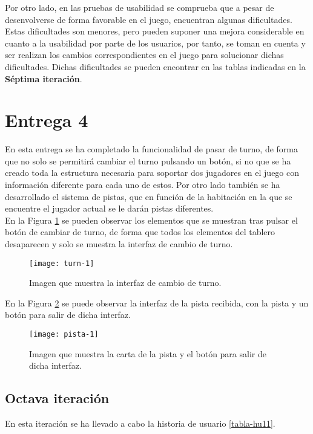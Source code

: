 Por otro lado, en las pruebas de usabilidad se comprueba que a pesar de desenvolverse de forma favorable en el juego, encuentran algunas dificultades. Estas dificultades son menores, pero pueden suponer una mejora considerable en cuanto a la usabilidad por parte de los usuarios, por tanto, se toman en cuenta y ser realizan los cambios correspondientes en el juego para solucionar dichas dificultades. Dichas dificultades se pueden encontrar en las tablas indicadas en la \textbf{Séptima iteración}.

\section{Entrega 4}
En esta entrega se ha completado la funcionalidad de pasar de turno, de forma que no solo se permitirá cambiar el turno pulsando un botón, si no que se ha creado toda la estructura necesaria para soportar dos jugadores en el juego con información diferente para cada uno de estos. Por otro lado también se ha desarrollado el sistema de pistas, que en función de la habitación en la que se encuentre el jugador actual se le darán pistas diferentes.\\

En la Figura \ref{figura-turn-1} se pueden observar los elementos que se muestran tras pulsar el botón de cambiar de turno, de forma que todos los elementos del tablero desaparecen y solo se muestra la interfaz de cambio de turno.

\begin{figure}[h]
  \centering
  \texttt{[image: turn-1]}
  \caption{Imagen que muestra la interfaz de cambio de turno.}
  \label{figura-turn-1}
\end{figure}

\newpage

En la Figura \ref{figura-pista-1} se puede observar la interfaz de la pista recibida, con la pista y un botón para salir de dicha interfaz.

\begin{figure}[h]
  \centering
  \texttt{[image: pista-1]}
  \caption{Imagen que muestra la carta de la pista y el botón para salir de dicha interfaz.}
  \label{figura-pista-1}
\end{figure}


\subsection{Octava iteración}
En esta iteración se ha llevado a cabo la historia de usuario \ref{tabla-hu11}.\\

